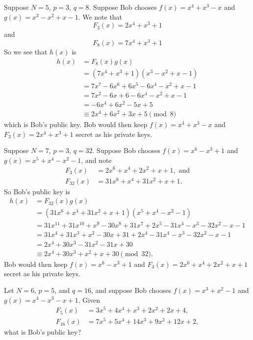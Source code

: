 \begin{example}
    Suppose $N = 5$, $p = 3$, $q = 8$. Suppose Bob chooses $f(x) = x^4 + x^3 - x$ and $g(x) = x^3 - x^2 + x - 1$. We note that
    \[
        F_3(x) = 2x^4 + x^3 + 1
    \]
    and
    \[
        F_8(x) = 7x^4 + x^3 + 1
    \]
    So we see that $h(x)$ is
    \begin{align*}
        h(x) &= F_8(x)g(x)\\
        &= (7x^4 + x^3 + 1)(x^3 - x^2 + x - 1)\\
        &= 7x^7 - 6x^6 + 6x^5 - 6x^4 - x^2 + x - 1\\
        &= 7x^2 - 6x + 6 - 6x^4 - x^2 + x - 1\\
        &= -6x^4 + 6x^2 - 5x + 5\\
        &\equiv 2x^4 + 6x^2 + 3x + 5 \pmod8
    \end{align*}
    which is Bob's public key. Bob would then keep $f(x) = x^4 + x^3 - x$ and $F_3(x) = 2x^4 + x^3 + 1$ secret as his private keys.
\end{example}
\begin{example}
    Suppose $N = 7$, $p = 3$, $q = 32$. Suppose Bob chooses $f(x) = x^6 - x^3 + 1$ and $g(x) = x^5 + x^4 - x^2 - 1$, and note
    \begin{align*}
        F_3(x) &= 2x^6 + x^4 + 2x^2 + x + 1, \text{ and}\\
        F_{32}(x) &= 31x^6 + x^4 + 31x^2 + x + 1.
    \end{align*}
    So Bob's public key is
    \begin{align*}
        h(x) &= F_{32}(x)g(x)\\
        &= (31x^6 + x^4 + 31x^2 + x + 1)(x^5 + x^4 - x^2 - 1)\\
        &= 31x^{11} + 31x^{10} + x^9 - 30x^8 + 31x^7 + 2x^5 - 31x^4 - x^3 - 32x^2 - x - 1\\
        &= 31x^4 + 31x^3 + x^2 - 30x + 31 + 2x^4 - 31x^4 - x^3 - 32x^2 - x - 1\\
        &= 2x^4 + 30x^3 - 31x^2 - 31x + 30\\
        &\equiv 2x^4 + 30x^3 + x^2 + x + 30 \pmod{32}.
    \end{align*}
    Bob would then keep $f(x) = x^6 - x^3 + 1$ and $F_3(x) = 2x^6 + x^4 + 2x^2 + x + 1$ secret as his private keys.
\end{example}

\begin{exercise}
    Let $N = 6$, $p = 5$, and $q = 16$, and suppose Bob chooses $f(x) = x^3 + x^2 - 1$ and $g(x) = x^4 - x^3 - x + 1$. Given
    \begin{align*}
        F_5(x) &= 3x^5 + 4x^4 + x^3 + 2x^2 + 2x + 4,\\
        F_{16}(x) &= 7x^5 + 5x^4 + 14x^3 + 9x^2 + 12x + 2,
    \end{align*}
    what is Bob's public key?
\end{exercise}

